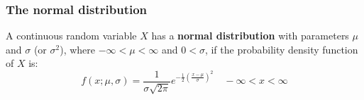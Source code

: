 \documentclass[9pt]{beamer}
\begin{document}
\begin{frame}
\frametitle{The normal distribution}

\begin{definition}
A continuous random variable $X$ has a \textbf{normal distribution} with parameters $\mu$ and $\sigma$ (or $\sigma^2$), where $-\infty < \mu < \infty$ and $0 < \sigma$, if the probability density function of $X$ is:
\begin{equation*}
f(x; \mu, \sigma) = \frac{1}{\sigma\sqrt{2 \pi}} e^{-\frac{1}{2}(\frac{x-\mu}{\sigma})^2} \quad -\infty < x < \infty
\end{equation*}
\end{definition}




\end{frame}
\end{document}
